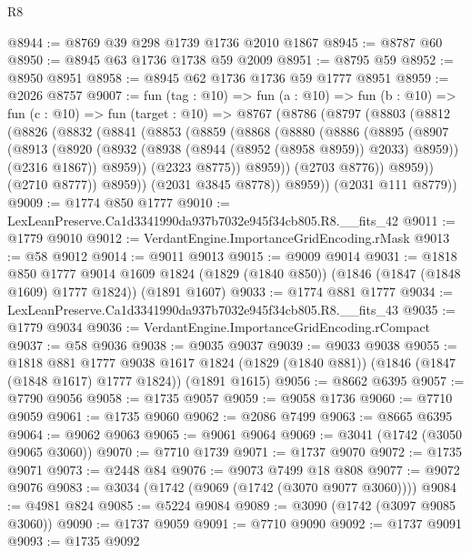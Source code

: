 \begin{lexlean}{R8}
\begin{coremodule}
@8944 := @8769 @39 @298 @1739 @1736 @2010 @1867
@8945 := @8787 @60
@8950 := @8945 @63 @1736 @1738 @59 @2009
@8951 := @8795 @59
@8952 := @8950 @8951
@8958 := @8945 @62 @1736 @1736 @59 @1777 @8951
@8959 := @2026 @8757
@9007 := fun (tag : @10) =>
  fun (a : @10) =>
  fun (b : @10) =>
  fun (c : @10) =>
  fun (target : @10) =>
  @8767
    (@8786
      (@8797
        (@8803
          (@8812
            (@8826
              (@8832
                (@8841
                  (@8853
                    (@8859
                      (@8868
                        (@8880
                          (@8886
                            (@8895
                              (@8907
                                (@8913
                                  (@8920
                                    (@8932 (@8938 (@8944 (@8952 (@8958 @8959)) @2033) @8959))
                                    (@2316 @1867))
                                  @8959))
                              (@2323 @8775))
                            @8959))
                        (@2703 @8776))
                      @8959))
                  (@2710 @8777))
                @8959))
            (@2031 @3845 @8778))
          @8959))
      (@2031 @111 @8779))
@9009 := @1774 @850 @1777
@9010 := LexLeanPreserve.Ca1d3341990da937b7032e945f34cb805.R8.__fits_42
@9011 := @1779 @9010
@9012 := VerdantEngine.ImportanceGridEncoding.rMask
@9013 := @58 @9012
@9014 := @9011 @9013
@9015 := @9009 @9014
@9031 := @1818
    @850
    @1777
    @9014
    @1609
    @1824
    (@1829 (@1840 @850))
    (@1846 (@1847 (@1848 @1609) @1777 @1824))
    (@1891 @1607)
@9033 := @1774 @881 @1777
@9034 := LexLeanPreserve.Ca1d3341990da937b7032e945f34cb805.R8.__fits_43
@9035 := @1779 @9034
@9036 := VerdantEngine.ImportanceGridEncoding.rCompact
@9037 := @58 @9036
@9038 := @9035 @9037
@9039 := @9033 @9038
@9055 := @1818
    @881
    @1777
    @9038
    @1617
    @1824
    (@1829 (@1840 @881))
    (@1846 (@1847 (@1848 @1617) @1777 @1824))
    (@1891 @1615)
@9056 := @8662 @6395
@9057 := @7790 @9056
@9058 := @1735 @9057
@9059 := @9058 @1736
@9060 := @7710 @9059
@9061 := @1735 @9060
@9062 := @2086 @7499
@9063 := @8665 @6395
@9064 := @9062 @9063
@9065 := @9061 @9064
@9069 := @3041 (@1742 (@3050 @9065 @3060))
@9070 := @7710 @1739
@9071 := @1737 @9070
@9072 := @1735 @9071
@9073 := @2448 @84
@9076 := @9073 @7499 @18 @808
@9077 := @9072 @9076
@9083 := @3034 (@1742 (@9069 (@1742 (@3070 @9077 @3060))))
@9084 := @4981 @824
@9085 := @5224 @9084
@9089 := @3090 (@1742 (@3097 @9085 @3060))
@9090 := @1737 @9059
@9091 := @7710 @9090
@9092 := @1737 @9091
@9093 := @1735 @9092

\end{coremodule}
\end{lexlean}
